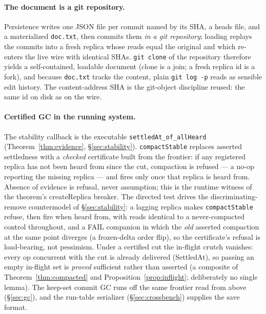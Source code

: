 \documentclass[11pt]{article}
\newcommand{\lean}[1]{\texttt{#1}}
\newcommand{\code}[1]{\texttt{#1}}
\begin{document}
\paragraph{The document is a git repository.} Persistence writes one
JSON file per commit named by its SHA, a heads file, and a materialized
\code{doc.txt}, then commits them \emph{in a git repository}; loading
replays the commits into a fresh replica whose reads equal the original
and which re-enters the live wire with identical SHAs. \code{git clone}
of the repository therefore yields a self-contained, loadable document
(clone is a join; a fresh replica id is a fork), and because
\code{doc.txt} tracks the content, plain \code{git log -p} reads as
sensible edit history. The content-address SHA is the git-object
discipline reused: the same id on disk as on the wire.

\paragraph{Certified GC in the running system.} The stability callback is
the executable \lean{settledAt\_of\_allHeard}
(Theorem~\ref{thm:evidence}, \S\ref{sec:stability}).
\code{compactStable} replaces asserted settledness with a \emph{checked}
certificate built from the frontier: if any registered replica has not
been heard from since the cut, compaction is refused --- a no-op
reporting the missing replica --- and fires only once that replica is
heard from. Absence of evidence is refusal, never assumption; this is the
runtime witness of the theorem's $\mathrm{createReplica}$ breaker. The
directed test drives the discriminating-remove countermodel of
\S\ref{sec:stability}: a lagging replica makes \code{compactStable}
refuse, then fire when heard from, with reads identical to a
never-compacted control throughout, and a FAIL companion in which the
\emph{old} asserted compaction at the same point diverges (a frozen-delta
order flip), so the certificate's refusal is load-bearing, not pessimism.
Under a certified cut the in-flight crutch vanishes: every op concurrent
with the cut is already delivered (SettledAt), so passing an empty
in-flight set is \emph{proved} sufficient rather than asserted (a
composite of Theorem~\ref{thm:compacted} and
Proposition~\ref{prop:inflight}; deliberately no single lemma). The
keep-set commit GC runs off the same frontier read from above
(\S\ref{sec:gc}), and the run-table serializer (\S\ref{sec:crossbench})
supplies the save format.
\end{document}
